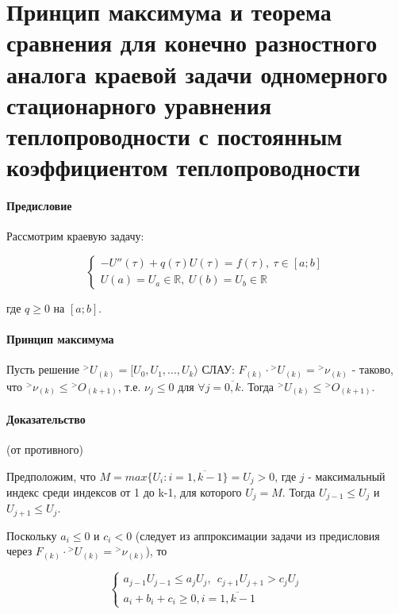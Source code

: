 \documentclass[__main__.tex]{subfiles}
\begin{document}
\section{Принцип максимума и теорема сравнения для конечно разностного аналога краевой задачи одномерного стационарного уравнения теплопроводности с постоянным коэффициентом теплопроводности}

\paragraph{Предисловие}

Рассмотрим краевую задачу:

\begin{equation}
\begin{cases}
-U''\left(\tau\right)+q\left(\tau\right) U \left(\tau\right) = f\left( \tau \right), \ \tau \in [a;b] \\
U\left(a\right) = U_a \in \mathbb{R}, \ U\left(b\right) = U_b \in \mathbb{R}
\end{cases}
\end{equation}

где $q \geq 0$ на $[a;b]$.

\paragraph{Принцип максимума}

Пусть решение  ${}^> U_{\left(k\right)} = [ U_0, U_1, ..., U_k \rangle$ СЛАУ: $F_{\left(k\right)} \cdot {}^> U_{\left(k\right)} = {}^> \nu_{\left(k\right)}$ - таково, что ${}^> \nu_{\left(k\right)} \leq {}^> O_{\left(k+1\right)}$, т.е. $\nu_j \leq 0$ для $\forall j = \overline{0,k}$. Тогда ${}^>U_{\left(k\right)} \leq {}^> O_{\left(k+1\right)}$.
\paragraph{Доказательство} (от противного)

Предположим, что $M = max \{U_i: i = \overline{1,k-1}\}=U_j > 0$, где $j$ - максимальный индекс среди индексов от 1 до k-1, для которого $U_j = M$. Тогда $U_{j-1} \leq U_j$ и $U_{j+1} \leq U_j$.

Поскольку $a_i \leq 0$ и $c_i < 0$ (следует из аппроксимации задачи из предисловия через $F_{\left(k\right)} \cdot {}^> U_{\left(k\right)} = {}^> \nu_{\left(k\right)}$), то

\begin{equation}\label{45.1}
\begin{cases}
a_{j-1} U_{j-1} \leq a_j U_j, \ \ c_{j+1} U_{j+1} > c_j U_j \\
a_i+b_i+c_i \geq 0, i = \overline{1,k-1}
\end{cases}
\end{equation}
\end{document}
